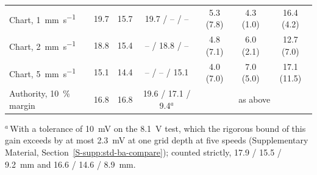 \begin{table}[!tbp]
\begin{tabular}{@{}lcccccc@{}}
    Chart, \SI{1}{\milli\metre\per\second} & 19.7 & 15.7 & 19.7 / -- / -- & 5.3 (7.8) & 4.3 (1.0) & 16.4 (4.2)\\
    Chart, \SI{2}{\milli\metre\per\second} & 18.8 & 15.4 & -- / 18.8 / -- & 4.8 (7.1) & 6.0 (2.1) & 12.7 (7.0)\\
    Chart, \SI{5}{\milli\metre\per\second} & 15.1 & 14.4 & -- / -- / 15.1 & 4.0 (7.0) & 7.0 (5.0) & 17.1 (11.5)\\
    Authority, \SI{10}{\percent} margin & 16.8 & 16.8 & 19.6 / 17.1 / 9.4$^{a}$ & \multicolumn{3}{c}{as above}\\
    \bottomrule
  \end{tabular}

  \smallskip
  \parbox{0.95\textwidth}{\footnotesize $^{a}$\,With a tolerance of \SI{10}{\milli\volt} on the \SI{8.1}{\volt} test, which the rigorous bound of this gain exceeds by at most \SI{2.3}{\milli\volt} at one grid depth at five speeds (Supplementary Material, Section~\ref{S-supp:std-ba-compare}); counted strictly, 17.9 / 15.5 / \SI{9.2}{\milli\metre} and 16.6 / 14.6 / \SI{8.9}{\milli\metre}.}
\end{table}

